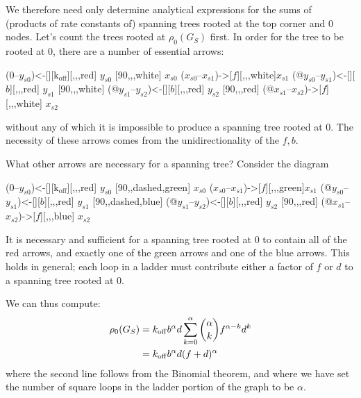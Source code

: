 We therefore need only determine analytical expressions for the sums of (products of rate constants of) spanning trees rooted at the top corner and 0 nodes. 
Let's count the trees rooted at $\rho_0(G_S)$ first.  In order for the tree to be rooted at $0$, there are a number of essential arrows:

\bigskip

\begin{center}
 \arrow(0--$y_{s0}$){<-[][$\mathrm{k_{off}}$]}[,,,red] $y_{s0}$
\arrow{<=>[$u$][$d$]}[90,,,white] 
$x_{s0}$ \arrow($x_{s0}$--$x_{s1}$){->[$f$]}[,,,white]$x_{s1}$
\arrow(@$y_{s0}$--$y_{s1}$){<-[][$b$]}[,,,red] $y_{s1}$ \arrow{<=>[$u$][$d$]}[90,,,white]
\arrow(@$y_{s1}$--$y_{s2}$){<-[][$b$]}[,,,red] $y_{s2}$
\arrow{<-[][$d$]}[90,,,red] 
\arrow(@$x_{s1}$--$x_{s2}$){->[$f$]}[,,,white] $x_{s2}$
\schemestop
\end{center}
without any of which it is impossible to produce a spanning tree rooted at $0.$  The necessity of these arrows comes from the unidirectionality of the $f, b.$

What other arrows are necessary for a spanning tree?  Consider the diagram

\begin{center}
 \arrow(0--$y_{s0}$){<-[][$\mathrm{k_{off}}$]}[,,,red] $y_{s0}$
\arrow{<-[][$d$]}[90,,dashed,green] 
$x_{s0}$ \arrow($x_{s0}$--$x_{s1}$){->[$f$]}[,,,green]$x_{s1}$
\arrow(@$y_{s0}$--$y_{s1}$){<-[][$b$]}[,,,red] $y_{s1}$ \arrow{<-[][$d$]}[90,,dashed,blue]
\arrow(@$y_{s1}$--$y_{s2}$){<-[][$b$]}[,,,red] $y_{s2}$
\arrow{<-[][$d$]}[90,,,red] 
\arrow(@$x_{s1}$--$x_{s2}$){->[$f$]}[,,,blue] $x_{s2}$
\schemestop
\end{center}

It is necessary and sufficient for a spanning tree rooted at $0$ to contain all of the red arrows, and exactly one of the green arrows and one of the blue arrows.  This holds in general; each loop in a ladder must contribute either a factor of $f$ or $d$ to a spanning tree rooted at 0.

We can thus compute:
\[
\begin{aligned}
\rho_0(G_S) &= k_{\rm off}b^\alpha d \sum_{k=0}^\alpha {\alpha\choose k}f^{\alpha-k}d^k\\
&=k_{\rm off}b^\alpha d (f + d)^\alpha
\end{aligned}
\]
where the second line follows from the Binomial theorem, and where we have set the number of square loops in the ladder portion of the graph to be $\alpha.$

